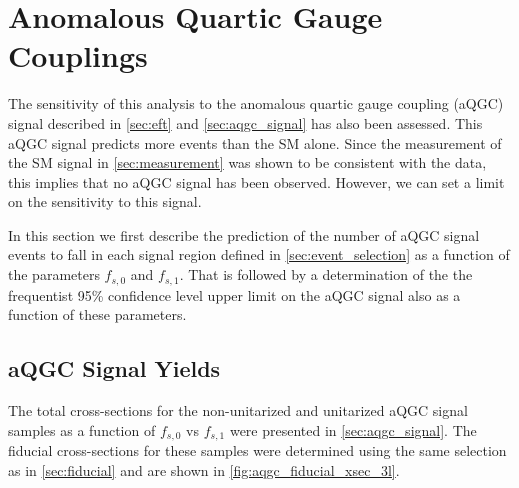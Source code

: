 \section{Anomalous Quartic Gauge Couplings}
\label{sec:aqgc_limit}

The sensitivity of this analysis to the anomalous quartic gauge coupling
(aQGC) signal described in \sec\ref{sec:eft} and 
\sec\ref{sec:aqgc_signal} has also been assessed.  This aQGC signal predicts
more events than the SM alone. Since the measurement of the SM signal in
\sec\ref{sec:measurement} was shown to be consistent with the data, this implies
that no aQGC signal has been observed. However, we can set a limit on the sensitivity 
to this signal.

In this section we first describe the prediction of the number of aQGC signal events
to fall in each signal region defined in \sec\ref{sec:event_selection} as a function
of the parameters $f_{s,0}$ and $f_{s,1}$. That is followed by 
a determination of the the frequentist 95\% confidence level upper limit on the aQGC
signal also as a function of these parameters. 

\subsection{aQGC Signal Yields}
The total cross-sections for the non-unitarized and unitarized aQGC
signal samples as a function of $f_{s,0}$ vs $f_{s,1}$ 
were presented in \sec\ref{sec:aqgc_signal}.
The fiducial cross-sections for these samples were determined using 
the same selection as in \sec\ref{sec:fiducial} and are shown in 
\fig\ref{fig:aqgc_fiducial_xsec_3l}.

